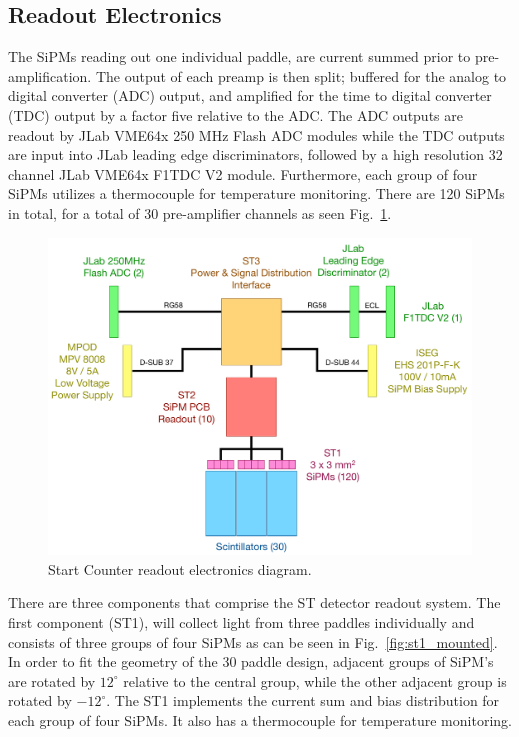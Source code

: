 \subsection{Readout Electronics} \label{sec:design_electronics}

The SiPMs reading out one individual paddle, are current summed prior to pre-amplification.  The output of each preamp is then split; buffered for the analog to digital converter (ADC) output, and amplified for the time to digital converter (TDC) output by a factor five relative to the ADC.  The ADC outputs are readout by JLab VME64x 250 MHz Flash ADC modules while the TDC outputs are input into JLab leading edge discriminators, followed by a high resolution 32 channel JLab VME64x F1TDC V2 module.  Furthermore, each group of four SiPMs utilizes a thermocouple for temperature monitoring. There are 120 SiPMs in total, for a total of 30 pre-amplifier channels as seen Fig.~\ref{fig:Start Counter Electronics}.

	\begin{figure}[!htb]
		\centering
		\includegraphics[width=1.0\columnwidth]{design/figs/st_electronics_diagram}
		\caption{Start Counter readout electronics diagram.}
		\label{fig:Start Counter Electronics}
	\end{figure}

There are three components that comprise the ST detector readout system.  The first component (ST1), will collect light from three paddles individually and consists of three groups of four SiPMs as can be seen in Fig.~\ref{fig:st1_mounted}.  In order to fit the geometry of the 30 paddle design, adjacent groups of SiPM's are rotated by $12^{\circ}$ relative to the central group, while the other adjacent group is rotated by $-12^{\circ}$.  The ST1 implements the current sum and bias distribution for each group of four SiPMs.  It also has a thermocouple for temperature monitoring.  

